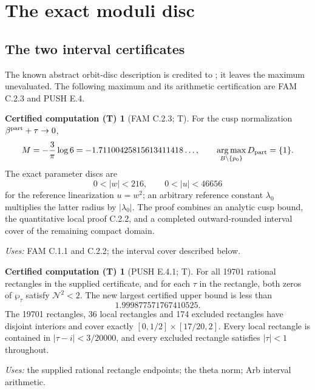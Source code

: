 \documentclass[11pt,a4paper]{article}
\theoremstyle{plain}
\theoremstyle{definition}
\newtheorem{computed}[theorem]{Certified computation (T)}
\begin{document}
\section{The exact moduli disc}\label{sec:maximum}

\subsection{The two interval certificates}
The known abstract orbit-disc description is credited to \cite[Corollary~\texttt{p2:cor:bare-period}]{DGKXv1}; it leaves the maximum unevaluated. The following maximum and its arithmetic certification are FAM C.2.3 and PUSH E.4.

\begin{computed}[FAM C.2.3; T]\label{fam:C.2.3}
For the cusp normalization $\beta^{\rm part}+\tau\to0$,
\[
 M=-\frac3\pi\log6=-1.71100425815613411418\ldots,
 \qquad \operatorname*{arg\,max}_{B\setminus\{p_0\}}D_{\rm part}=\{1\}.
\]
The exact parameter discs are
\[
 0<|w|<216,
 \qquad 0<|u|<46656
\]
for the reference linearization $u=w^2$; an arbitrary reference constant
$\lambda_0$ multiplies the latter radius by $|\lambda_0|$.
The proof combines an analytic cusp bound, the quantitative local proof
C.2.2, and a completed outward-rounded interval cover of the remaining
compact domain.
\end{computed}
\noindent\textit{Uses:} FAM C.1.1 and C.2.2; the interval cover described below.\par

\begin{computed}[PUSH E.4.1; T]\label{push:E.4.1}
For all 19701 rational rectangles in the supplied certificate, and for
each $\tau$ in the rectangle, both zeros of $\wp_\tau$ satisfy
$\mathcal N^2<2$. The new largest certified upper bound is less than
\[
 1.999877571767410525.
\]
The 19701 rectangles, 36 local rectangles and 174 excluded rectangles
have disjoint interiors and cover exactly
$[0,1/2]\times[17/20,2]$. Every local rectangle is contained in
$|\tau-i|<3/20000$, and every excluded rectangle satisfies
$|\tau|<1$ throughout.
\end{computed}
\noindent\textit{Uses:} the supplied rational rectangle endpoints; the theta norm; Arb interval arithmetic.\par
\end{document}
